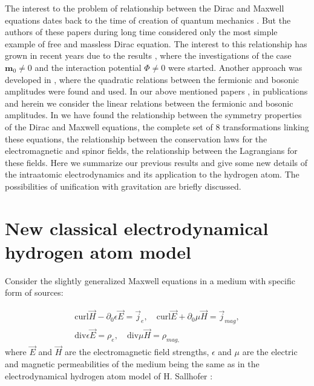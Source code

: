 \documentclass[a4paper,12pt]{article}
\begin{document}
The interest to the problem of relationship between the Dirac and Maxwell
equations dates back to the time of creation of quantum mechanics \cite{DAR}%
. But the authors of these papers during long time considered only the most
simple example of free and massless Dirac equation. The interest to this
relationship has grown in recent years due to the results \cite{SALL}, where
the investigations of the case $\mathbf{m}_0\neq 0$ and the interaction
potential $\Phi \neq 0$ were started. Another approach was developed in \cite
{DAV}, where the quadratic relations between the fermionic and bosonic
amplitudes were found and used. In our above mentioned papers \cite{S1,SK},
in publications \cite{S2} and herein we consider the linear relations
between the fermionic and bosonic amplitudes. In \cite{S2} we have found the
relationship between the symmetry properties of the Dirac and Maxwell
equations, the complete set of 8 transformations linking these equations,
the relationship between the conservation laws for the electromagnetic and
spinor fields, the relationship between the Lagrangians for these fields.
Here we summarize our previous results and give some new details of the
intraatomic electrodynamics and its application to the hydrogen atom. The
possibilities of unification with gravitation are briefly discussed.

\section{New classical electrodynamical hydrogen atom model}

Consider the slightly generalized Maxwell equations in a medium with
specific form of sources:

\begin{equation}
\begin{array}{c}
\mathrm{curl}\overrightarrow{H}-\partial _0\epsilon \overrightarrow{E}=
\overrightarrow{j}_e, \quad \mathrm{curl}\overrightarrow{E}+\partial _0\mu
\overrightarrow{H}=\overrightarrow{j}_{mag}, \\
\mathrm{div}\epsilon \overrightarrow{E}=\rho _e, \quad \mathrm{div}\mu
\overrightarrow{H}=\rho _{mag,}
\end{array}
\label{f1}
\end{equation}
where $\overrightarrow{E}$ and $\overrightarrow{H}$ are the electromagnetic
field strengths, $\epsilon $ and $\mu $ are the electric and magnetic
permeabilities of the medium being the same as in the electrodynamical
hydrogen atom model of H. Sallhofer \cite{SALL}:
\end{document}
